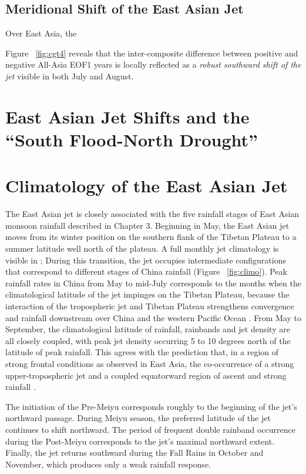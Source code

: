 \subsection{Meridional Shift of the East Asian Jet}

	Over East Asia, the 
	
		Figure ~\ref{fig:cgt4} reveals that the inter-composite difference between positive and negative All-Asia EOF1 years is locally reflected as a \textit{robust southward shift of the jet} visible in both July and August.
		
		
		
		
		
		

\section{East Asian Jet Shifts and the ``South Flood-North Drought''}

\section{Climatology of the East Asian Jet}

	The East Asian jet is closely associated with the five rainfall stages of East Asian monsoon rainfall described in Chapter 3. Beginning in May, the East Asian jet moves from its winter position on the southern flank of the Tibetan Plateau to a summer latitude well north of the plateau.  A full monthly jet climatology is visible in \citet{Schiemann2009}; During this transition, the jet occupies intermediate configurations that correspond to different stages of China rainfall (Figure ~\ref{fig:climo}). Peak rainfall rates in China from May to mid-July corresponds to the months when the climatological latitude of the jet impinges on the Tibetan Plateau, because the interaction of the tropospheric jet and Tibetan Plateau strengthens convergence and rainfall downstream over China and the western Pacific Ocean \citep{Molnar2010,Sampe2010,Chen2014}. From May to September,  the climatological latitude of rainfall, rainbands and jet density are all closely coupled, with peak jet density occurring 5 to 10 degrees north of the latitude of peak rainfall. This agrees with the prediction that, in a region of strong frontal conditions as observed in East Asia, the co-occurrence of a strong upper-tropospheric jet and a coupled equatorward region of ascent and strong rainfall \citep{Holton2004}. 
	
	The initiation of the Pre-Meiyu corresponds roughly to the beginning of the jet's northward passage. During Meiyu season, the preferred latitude of the jet continues to shift northward. The period of frequent double rainband occurrence during the Post-Meiyu corresponds to the jet's maximal northward extent. Finally, the jet returns southward during the Fall Rains in October and November, which produces only a weak rainfall response.
	
